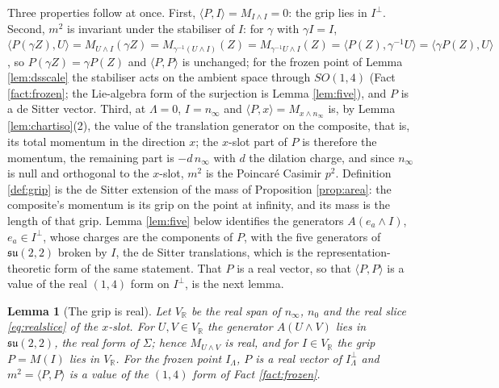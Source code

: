 \documentclass[11pt]{article}
\newtheorem{lemma}[theorem]{Lemma}
\theoremstyle{definition}
\newcommand{\R}{\mathbb{R}}
\newcommand{\ip}[2]{\langle #1, #2\rangle}
\begin{document}
Three properties follow at once. First, $\ip{P}{I} = M_{I\wedge I} = 0$: the grip lies in $I^{\perp}$. Second, $m^{2}$ is invariant under the stabiliser of $I$: for $\gamma$ with $\gamma I = I$, $\ip{P(\gamma Z)}{U} = M_{U\wedge I}(\gamma Z) = M_{\gamma^{-1}(U\wedge I)}(Z) = M_{\gamma^{-1}U\wedge I}(Z) = \ip{P(Z)}{\gamma^{-1}U} = \ip{\gamma P(Z)}{U}$, so $P(\gamma Z) = \gamma P(Z)$ and $\ip{P}{P}$ is unchanged; for the frozen point of Lemma \ref{lem:dsscale} the stabiliser acts on the ambient space through $SO(1,4)$ (Fact \ref{fact:frozen}; the Lie-algebra form of the surjection is Lemma \ref{lem:five}), and $P$ is a de Sitter vector. Third, at $\Lambda = 0$, $I = n_{\infty}$ and $\ip{P}{x} = M_{x\wedge n_{\infty}}$ is, by Lemma \ref{lem:chartiso}(2), the value of the translation generator on the composite, that is, its total momentum in the direction $x$; the $x$-slot part of $P$ is therefore the momentum, the remaining part is $-d\,n_{\infty}$ with $d$ the dilation charge, and since $n_{\infty}$ is null and orthogonal to the $x$-slot, $m^{2}$ is the Poincar\'e Casimir $p^{2}$. Definition \ref{def:grip} is the de Sitter extension of the mass of Proposition \ref{prop:area}: the composite's momentum is its grip on the point at infinity, and its mass is the length of that grip. Lemma \ref{lem:five} below identifies the generators $A(e_{a}\wedge I)$, $e_{a} \in I^{\perp}$, whose charges are the components of $P$, with the five generators of $\mathfrak{su}(2,2)$ broken by $I$, the de Sitter translations, which is the representation-theoretic form of the same statement. That $P$ is a real vector, so that $\ip{P}{P}$ is a value of the real $(1,4)$ form on $I^{\perp}$, is the next lemma.

\begin{lemma}[The grip is real]\label{lem:real}
Let $V_{\R}$ be the real span of $n_{\infty}$, $n_{0}$ and the real slice \eqref{eq:realslice} of the $x$-slot. For $U, V \in V_{\R}$ the generator $A(U\wedge V)$ lies in $\mathfrak{su}(2,2)$, the real form of $\Sigma$; hence $M_{U\wedge V}$ is real, and for $I \in V_{\R}$ the grip $P = M(I)$ lies in $V_{\R}$. For the frozen point $I_{\Lambda}$, $P$ is a real vector of $I_{\Lambda}^{\perp}$ and $m^{2} = \ip{P}{P}$ is a value of the $(1,4)$ form of Fact \ref{fact:frozen}.
\end{lemma}
\end{document}
